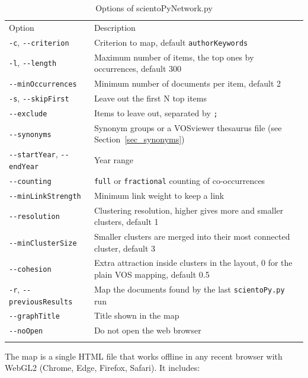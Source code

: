 \documentclass[10pt,letterpaper]{article}
\begin{document}
\begin{table}[!h]
	\centering
	\caption{Options of scientoPyNetwork.py}
	\label{table_network_options}

	\renewcommand{\arraystretch}{1.4}
	\begin{tabular}{ p{4.6cm} p{12cm}}
	\hline\noalign{\smallskip}
	Option     &  Description                             \\
	\noalign{\smallskip}\hline\noalign{\smallskip}
	\verb|-c|, \verb|--criterion| & Criterion to map, default \verb|authorKeywords| \\
	\verb|-l|, \verb|--length| & Maximum number of items, the top ones by occurrences, default 300 \\
	\verb|--minOccurrences| & Minimum number of documents per item, default 2 \\
	\verb|-s|, \verb|--skipFirst| & Leave out the first N top items \\
	\verb|--exclude| & Items to leave out, separated by \verb|;| \\
	\verb|--synonyms| & Synonym groups or a VOSviewer thesaurus file (see Section~\ref{sec_synonyms}) \\
	\verb|--startYear|, \verb|--endYear| & Year range \\
	\verb|--counting| & \verb|full| or \verb|fractional| counting of co-occurrences \\
	\verb|--minLinkStrength| & Minimum link weight to keep a link \\
	\verb|--resolution| & Clustering resolution, higher gives more and smaller clusters, default 1 \\
	\verb|--minClusterSize| & Smaller clusters are merged into their most connected cluster, default 3 \\
	\verb|--cohesion| & Extra attraction inside clusters in the layout, 0 for the plain VOS mapping, default 0.5 \\
	\verb|-r|, \verb|--previousResults| & Map the documents found by the last \verb|scientoPy.py| run \\
	\verb|--graphTitle| & Title shown in the map \\
	\verb|--noOpen| & Do not open the web browser \\
	\noalign{\smallskip}\hline
	\end{tabular}
\end{table}

The map is a single HTML file that works offline in any recent browser with WebGL2 (Chrome, Edge, Firefox, Safari). It includes:
\end{document}
